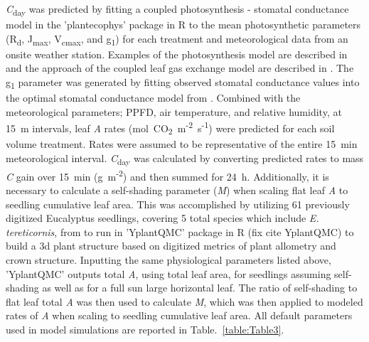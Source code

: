 \documentclass[a4paper]{article}\usepackage[]{graphicx}\usepackage[]{color}
\begin{document}
\textit{C}\textsubscript{day} was predicted by fitting a coupled photosynthesis - stomatal conductance model \citep{farquhar1980biochemical,medlyn2011reconciling} in the 'plantecophys' package in R \citep{Duursma2014} to the mean photosynthetic parameters (R\textsubscript{d}, J\textsubscript{max}, V\textsubscript{cmax}, and g\textsubscript{1}) for each treatment and meteorological data from an onsite weather station.  Examples of the photosynthesis model are described in \citet{medlyn2002temperature} and the approach of the coupled leaf gas exchange model are described in \citet{duursma2014peaked}. The g\textsubscript{1} parameter was generated by fitting observed stomatal conductance values into the optimal stomatal conductance model from \citep{medlyn2012reconciling}. Combined with the meteorological parameters; PPFD, air temperature, and relative humidity, at 15~m intervals, leaf \textit{A} rates ({\textmugreek}mol~CO\textsubscript{2}~m\textsuperscript{-2}~s\textsuperscript{-1}) were predicted for each soil volume treatment. Rates were assumed to be representative of the entire 15~min meteorological interval. \textit{C}\textsubscript{day} was calculated by converting predicted rates to mass \textit{C} gain over 15~min (g~m\textsuperscript{-2}) and then summed for 24~h. Additionally, it is necessary to calculate a self-shading parameter (\textit{M}) when scaling flat leaf \textit{A} to seedling cumulative leaf area. This was accomplished by utilizing 61 previously digitized Eucalyptus seedlings, covering 5 total species which include \textit{E. tereticornis}, from \citet{duursma2012light} to run in 'YplantQMC' package in R (fix cite YplantQMC) to build a 3d plant structure based on digitized metrics of plant allometry and crown structure. Inputting the same physiological parameters listed above, 'YplantQMC' outputs total \textit{A}, using total leaf area, for seedlings assuming self-shading as well as for a full sun large horizontal leaf.  The ratio of self-shading to flat leaf total \textit{A} was then used to calculate \textit{M}, which was then applied to modeled rates of \textit{A} when scaling to seedling cumulative leaf area. All default parameters used in model simulations are reported in Table.~\ref{table:Table3}.
\end{document}

